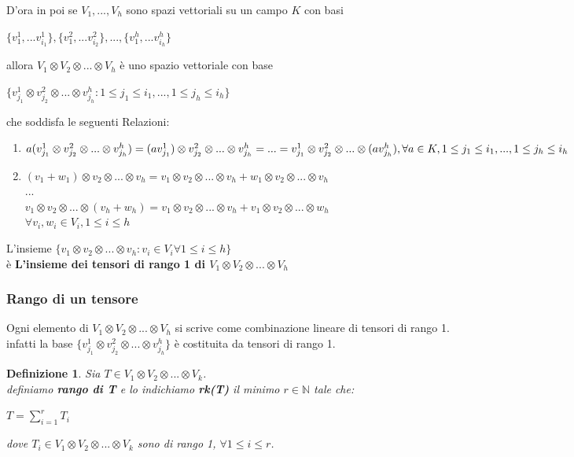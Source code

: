 \documentclass[a4paper,12pt]{article}
\theoremstyle{def}
\newtheorem*{definition}{Definizione}
\theoremstyle{prop}
\theoremstyle{esempio}
\theoremstyle{dimostrazione}
\theoremstyle{teo}
\theoremstyle{osservazione}
\begin{document}
D'ora in poi se \(V_1, ..., V_h\) sono spazi vettoriali su un campo \(K\) con basi
\begin{center}
	\(\{v_1^1, ... v_{i_1}^1\}, \{v_1^2, ... v_{i_2}^2\}, ..., \{v_1^h, ... v_{i_h}^h\}\)
\end{center}
allora \(V_1 \otimes V_2 \otimes ... \otimes V_h\) è uno spazio vettoriale con base
\begin{center}
	\(\{v_{j_1}^1 \otimes v_{j_2}^2 \otimes ... \otimes v_{j_h}^h : 1 \leq j_1 \leq i_1, ... , 1 \leq j_h \leq i_h\}\)
\end{center}
che soddisfa le seguenti Relazioni:
\begin{enumerate}
	\item \(a(v_{j_1}^1 \otimes v_{j_2}^2 \otimes ... \otimes v_{j_h}^h) = (a v_{j_1}^1) \otimes v_{j_2}^2 \otimes ... \otimes v_{j_h}^h = ... = v_{j_1}^1 \otimes v_{j_2}^2 \otimes ... \otimes (a v_{j_h}^h),\\
	      \forall a \in K,  1 \leq j_1 \leq i_1, ... , 1 \leq j_h \leq i_h\)
	\item \((v_1 + w_1) \otimes v_2 \otimes ... \otimes v_h = v_1 \otimes v_2 \otimes ... \otimes v_h + w_1 \otimes v_2 \otimes ... \otimes v_h\)\\
	      \(...\)\\
	      \(v_1 \otimes v_2 \otimes ... \otimes (v_h + w_h) = v_1 \otimes v_2 \otimes ... \otimes v_h + v_1 \otimes v_2 \otimes ... \otimes w_h\)\\
	      \(\forall v_i, w_i \in V_i, 1 \leq i \leq h\)
\end{enumerate}
L'insieme \(\{v_1 \otimes v_2 \otimes ... \otimes v_h : v_i \in V_i \forall 1 \leq i \leq h\}\)\\
è \textbf{L'insieme dei tensori di rango 1 di \(V_1 \otimes V_2 \otimes ... \otimes V_h\)}\\

\subsubsection{Rango di un tensore}

Ogni elemento di \(V_1 \otimes V_2 \otimes ... \otimes V_h\) si scrive come combinazione lineare di tensori di rango 1.\\
infatti la base \(\{v_{j_1}^1 \otimes v_{j_2}^2 \otimes ... \otimes v_{j_h}^h\}\) è costituita da tensori di rango 1.\\

\begin{definition}
	Sia \(T \in V_1 \otimes V_2 \otimes ... \otimes V_k\).\\
	definiamo \textbf{rango di T} e lo indichiamo \textbf{rk(T)} il minimo \(r \in \mathbb{N}\) tale che:
	\begin{center}
		\(T = \sum_{i=1}^{r}T_i\)
	\end{center}
	dove \(T_i \in V_1 \otimes V_2 \otimes ... \otimes V_k\) sono di rango 1, \(\forall 1 \leq i \leq r\).
\end{definition}
\end{document}
